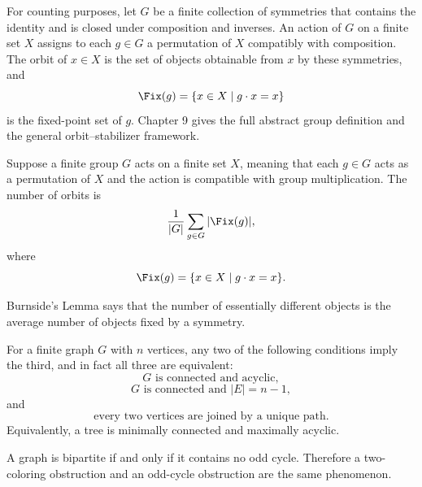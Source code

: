     \begin{definition}
        For counting purposes, let $G$ be a finite collection of symmetries that
        contains the identity and is closed under composition and inverses. An
        action of $G$ on a finite set $X$ assigns to each $g\in G$ a permutation
        of $X$ compatibly with composition. The orbit of $x\in X$ is the set of
        objects obtainable from $x$ by these symmetries, and
        \[
            \Fix(g)=\{x\in X\mid g\cdot x=x\}
        \]
        is the fixed-point set of $g$. Chapter 9 gives the full abstract group
        definition and the general orbit--stabilizer framework.
    \end{definition}

    \begin{theorem}
        Suppose a finite group $G$ acts on a finite set $X$, meaning that each
        $g\in G$ acts as a permutation of $X$ and the action is compatible with
        group multiplication. The number of orbits is
        \[
            \frac{1}{|G|}
            \sum_{g\in G}|\Fix(g)|,
        \]
        where
        \[
            \Fix(g)
            =
            \{x\in X\mid g\cdot x=x\}.
        \]
    \end{theorem}

    \begin{idea}
        Burnside's Lemma says that the number of essentially different objects
        is the average number of objects fixed by a symmetry.
    \end{idea}

    \begin{theorem}
        For a finite graph $G$ with $n$ vertices, any two of the following
        conditions imply the third, and in fact all three are equivalent:
        \[
            G\text{ is connected and acyclic},
        \]
        \[
            G\text{ is connected and }|E|=n-1,
        \]
        and
        \[
            \text{every two vertices are joined by a unique path}.
        \]
        Equivalently, a tree is minimally connected and maximally acyclic.
    \end{theorem}

    \begin{theorem}
        A graph is bipartite if and only if it contains no odd cycle. Therefore
        a two-coloring obstruction and an odd-cycle obstruction are the same
        phenomenon.
    \end{theorem}

